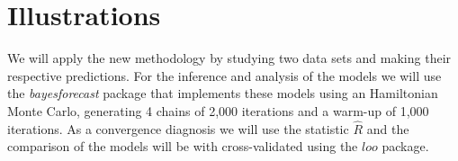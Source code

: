 \section{Illustrations}
We will apply the new methodology by studying two data sets and making their respective predictions. For the inference and analysis of the models we will use the \textit{bayesforecast} package that implements these models using an Hamiltonian Monte Carlo, generating 4 chains of 2,000 iterations and a warm-up of 1,000 iterations. As a convergence diagnosis we will use the statistic $\hat{R}$ \cite{BDA} and the comparison of the models will be with cross-validated using the $\textit{loo}$ \citet{waic} package.
%
